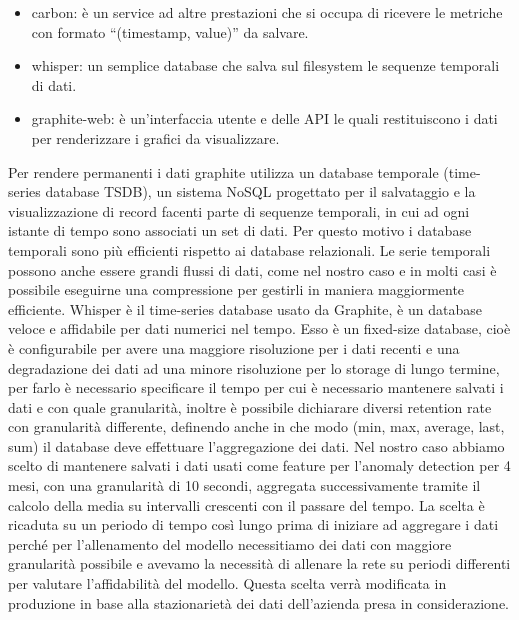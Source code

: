 \begin{itemize}
    \item carbon: è un service ad altre prestazioni che si occupa di ricevere le metriche con formato ``(timestamp, value)'' da salvare.
    \item whisper: un semplice database che salva sul filesystem le sequenze temporali di dati.
    \item graphite-web: è un'interfaccia utente e delle API le quali restituiscono i dati per renderizzare i grafici da visualizzare.
\end{itemize}

Per rendere permanenti i dati graphite utilizza un database temporale (time-series database TSDB), un sistema NoSQL progettato per il salvataggio e la visualizzazione di record facenti parte di sequenze temporali, in cui ad ogni istante di tempo sono associati un set di dati. Per questo motivo i database temporali sono più efficienti rispetto ai database relazionali. Le serie temporali possono anche essere grandi flussi di dati, come nel nostro caso e in molti casi è possibile eseguirne una compressione per gestirli in maniera maggiormente efficiente.
Whisper è il time-series database usato da Graphite, è un database veloce e affidabile per dati numerici nel tempo. Esso è un fixed-size database, cioè è configurabile per avere una maggiore risoluzione per i dati recenti e una degradazione dei dati ad una minore risoluzione per lo storage di lungo termine, per farlo è necessario specificare il tempo per cui è necessario mantenere salvati i dati e con quale granularità, inoltre è possibile dichiarare diversi retention rate con granularità differente, definendo anche in che modo (min, max, average, last, sum) il database deve effettuare l'aggregazione dei dati.
Nel nostro caso abbiamo scelto di mantenere salvati i dati usati come feature per l'anomaly detection per 4 mesi, con una granularità di 10 secondi, aggregata successivamente tramite il calcolo della media su intervalli crescenti con il passare del tempo. La scelta è ricaduta su un periodo di tempo così lungo prima di iniziare ad aggregare i dati perché per l'allenamento del modello necessitiamo dei dati con maggiore granularità possibile e avevamo la necessità di allenare la rete su periodi differenti per valutare l'affidabilità del modello. Questa scelta verrà modificata in produzione in base alla stazionarietà dei dati dell'azienda presa in considerazione.


